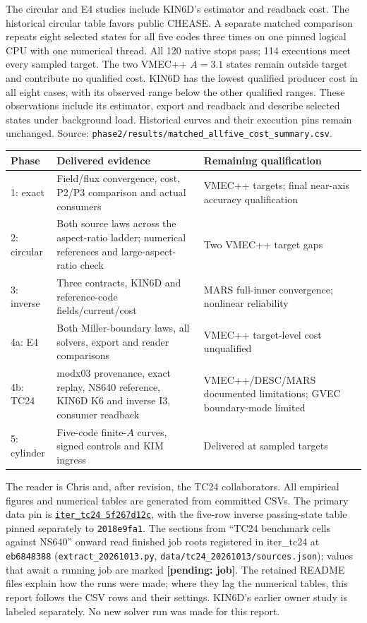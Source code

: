 \documentclass[10pt,a4paper]{article}
\newcommand{\tcroot}{https://gitlab.tugraz.at/plasma/proj/ntv/iter_tc24/-/blob/5f267d12c/}
\newcommand{\tcfile}[2]{\href{\tcroot#1}{#2}}
\newcommand{\pending}[1]{\textcolor{red!70!black}{\textbf{[pending: #1]}}}
\begin{document}
The circular and E4 studies include KIN6D's estimator and readback cost.
The historical circular table favors public CHEASE. A separate matched
comparison repeats eight selected states for all five codes three times on
one pinned logical CPU with one numerical thread. All 120 native stops pass;
114 executions meet every sampled target. The two VMEC++ $A=3.1$ states
remain outside target and contribute no qualified cost. KIN6D has the lowest
qualified producer cost in all eight cases, with its observed range below
the other qualified ranges. These observations include its estimator,
export and readback and describe selected states under background load.
Historical curves and their execution pins remain unchanged.
Source: \texttt{phase2/results/matched\_allfive\_cost\_summary.csv}.

\begin{center}\small
\begin{tabular}{p{25mm}p{91mm}p{37mm}}
\toprule
Phase & Delivered evidence & Remaining qualification \\
\midrule
1: exact & Field/flux convergence, cost, P2/P3 comparison and actual consumers & VMEC++ targets; final near-axis accuracy qualification \\
2: circular & Both source laws across the aspect-ratio ladder; numerical references and large-aspect-ratio check & Two VMEC++ target gaps \\
3: inverse & Three contracts, KIN6D and reference-code fields/current/cost & MARS full-inner convergence; nonlinear reliability \\
4a: E4 & Both Miller-boundary laws, all solvers, export and reader comparisons & VMEC++ target-level cost unqualified \\
4b: TC24 & modx03 provenance, exact replay, NS640 reference, KIN6D K6 and inverse I3, consumer readback & VMEC++/DESC/MARS documented limitations; GVEC boundary-mode limited \\
5: cylinder & Five-code finite-$A$ curves, signed controls and KIM ingress & Delivered at sampled targets \\
\bottomrule
\end{tabular}
\end{center}

The reader is Chris and, after revision, the TC24 collaborators. All empirical
figures and numerical tables are generated from committed CSVs. The primary
data pin is \tcfile{PLAN.md}{\texttt{iter\_tc24 5f267d12c}}, with the five-row
inverse passing-state table pinned separately to \texttt{2018e9fa1}.
The sections from ``TC24 benchmark cells against NS640'' onward read finished job
roots registered in iter\_tc24 at \texttt{eb6848388}
(\texttt{extract\_20261013.py}, \texttt{data/tc24\_20261013/sources.json});
values that await a running job are marked \pending{job}. The retained
README files explain how the runs were made; where they lag the numerical
tables, this report follows the CSV rows and their settings. KIN6D's earlier
owner study is labeled separately. No new solver run was made for this report.
\end{document}
